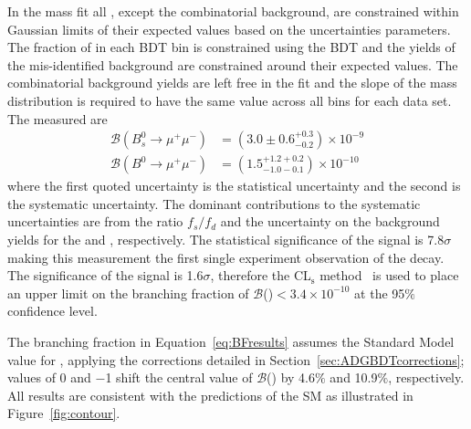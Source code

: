 {{In the mass fit all \pdfs, except the combinatorial background, are constrained within Gaussian limits of their expected values based on the uncertainties \pdf parameters. 
The fraction of \bmumu in each BDT bin is constrained using the BDT \pdf and the yields of the mis-identified background are constrained around their expected values. The combinatorial background yields are left free in the fit and the slope of the mass distribution is required to have the same value across all bins for each data set.
The measured \BFs are
\begin{equation}
\begin{split}
  \mathcal{B}(B^{0}_{s} \to \mu^{+} \mu^{-}) &= (3.0 \pm 0.6^{+0.3}_{-0.2}) \times 10^{-9} \\
  \mathcal{B}(B^{0} \to \mu^{+} \mu^{-}) &= (1.5^{+1.2 +0.2}_{-1.0 -0.1})    \times 10^{-10} 
\end{split}
\label{eq:BFresults}
\end{equation}
where the first quoted uncertainty is the statistical uncertainty and the second is the systematic uncertainty. The dominant contributions to the systematic uncertainties are from the ratio $f_s / f_d$ and the uncertainty on the background yields for the \bsmumu and \bdmumu \BFs, respectively. %
The statistical significance of the \bsmumu signal is 7.8$\sigma$ making this measurement the first single experiment observation of the \bsmumu decay. The significance of the \bdmumu signal is 1.6$\sigma$, therefore the CL$_{\text{s}}$ method~\cite{0954-3899-28-10-313} is used to place an upper limit on the branching fraction of $\mathcal{B}$(\bdmumu)$ < 3.4 \times 10^{-10}$ at the 95$\%$ confidence level.

The \bsmumu branching fraction in Equation~\ref{eq:BFresults} assumes the Standard Model value for \ADG, applying the corrections detailed in Section~\ref{sec:ADGBDTcorrections}; \ADG values of 0 and $-$1 shift the central value of $\mathcal{B}$(\bsmumu) by 4.6$\%$ and 10.9$\%$, respectively. All results are consistent with the predictions of the SM as illustrated in Figure~\ref{fig:contour}.


}}
